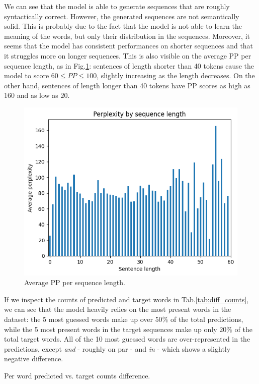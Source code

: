 We can see that the model is able to generate sequences that are roughly syntactically correct. However, the generated sequences are not semantically solid. This is probably due to the fact that the model is not able to learn the meaning of the words, but only their distribution in the sequences. Moreover, it seems that the model has consistent performances on shorter sequences and that it struggles more on longer sequences. This is also visible on the average PP per sequence length, as in Fig.\ref{fig:avg_pp_per_seq_len}: sentences of length shorter than 40 tokens cause the model to score $60 \le PP \le 100$, slightly increasing as the length decreases. On the other hand, sentences of length longer than 40 tokens have PP scores as high as $160$ and as low as $20$.
\begin{figure}
    \centering
    \includegraphics[width=.45\textwidth]{./assets/images/ppl_by_len}
    \caption{Average PP per sequence length.}
    \label{fig:avg_pp_per_seq_len}
\end{figure}

If we inspect the counts of predicted and target words in Tab.\ref{tab:diff_counts}, we can see that the model heavily relies on the most present words in the dataset: the 5 most guessed words make up over $50\%$ of the total predictions, while the 5 most present words in the target sequences make up only $20\%$ of the total target words. All of the 10 most guessed words are over-represented in the predictions, except \emph{and} - roughly on par - and \emph{in} - which shows a slightly negative difference.

\begin{table}
    \centering
    
    \caption{Per word predicted vs. target counts difference.}
    \label{tab:diff_counts}
\end{table}

